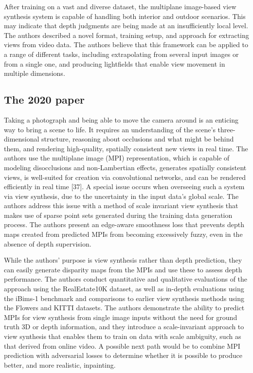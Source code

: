 After training on a vast and diverse dataset, the multiplane image-based view synthesis system is capable of handling both interior and outdoor scenarios.
This may indicate that depth judgments are being made at an insufficiently local level. The authors described a novel format, training setup, and approach for extracting views from video data. The authors believe that this framework can be applied to a range of different tasks, including extrapolating from several input images or from a single one, and producing lightfields that enable view movement in multiple dimensions.

 \subsection{The 2020 paper}\label{subsec2:2020}

Taking a photograph and being able to move the camera around is an enticing way to bring a scene to life. It requires an understanding of the scene's three-dimensional structure, reasoning about occlusions and what might be behind them, and rendering high-quality, spatially consistent new views in real time. The authors use the multiplane image (MPI) representation, which is capable of modeling disocclusions and non-Lambertian effects, generates spatially consistent views, is well-suited for creation via convolutional networks, and can be rendered efficiently in real time [37]. A special issue occurs when overseeing such a system via view synthesis, due to the uncertainty in the input data's global scale. The authors address this issue with a method of scale invariant view synthesis that makes use of sparse point sets generated during the training data generation process. The authors present an edge-aware smoothness loss that prevents depth maps created from predicted MPIs from becoming excessively fuzzy, even in the absence of depth supervision.

While the authors' purpose is view synthesis rather than depth prediction, they can easily generate disparity maps from the MPIs and use these to assess depth performance. The authors conduct quantitative and qualitative evaluations of the approach using the RealEstate10K dataset, as well as in-depth evaluations using the iBims-1 benchmark and comparisons to earlier view synthesis methods using the Flowers and KITTI datasets. The authors demonstrate the ability to predict MPIs for view synthesis from single image inputs without the need for ground truth 3D or depth information, and they introduce a scale-invariant approach to view synthesis that enables them to train on data with scale ambiguity, such as that derived from online video. A possible next path would be to combine MPI prediction with adversarial losses to determine whether it is possible to produce better, and more realistic, inpainting.

